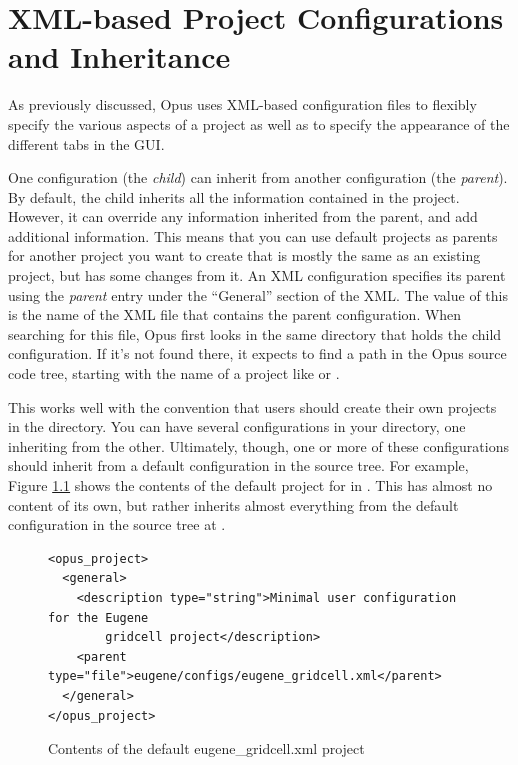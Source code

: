 \chapter{XML-based Project Configurations and Inheritance}
\label{chapter:xml-inheritance}

As previously discussed, Opus uses XML-based configuration files to
flexibly specify the various aspects of a project as well as to specify the
appearance of the different tabs in the GUI\@.

One configuration (the \emph{child}) can inherit from another configuration
(the \emph{parent}).  By default, the child inherits all the information
contained in the project.  However, it can override any information
inherited from the parent, and add additional information.  This means that
you can use default projects as parents for another project you want to
create that is mostly the same as an existing project, but has some changes
from it.  An XML configuration specifies its parent using the \emph{parent}
entry under the ``General'' section of the XML\@.  The value of this is the
name of the XML file that contains the parent configuration.  When
searching for this file, Opus first looks in the same directory that holds
the child configuration.  If it's not found there, it expects to find a
path in the Opus source code tree, starting with the name of a project like
 or .

This works well with the convention that users should create their own
projects in the  directory.  You can have
several configurations in your  directory, one
inheriting from the other.  Ultimately, though, one or more of these
configurations should inherit from a default configuration in the source
tree.  For example, Figure \ref{fig:eugene-gridcell-xml-default} shows the
contents of the default project for  in
.  This has almost no content of its own, but
rather inherits almost everything from the default configuration in the
source tree at .

\begin{figure}[htp]
\begin{center}
\begin{verbatim}
<opus_project>
  <general>
    <description type="string">Minimal user configuration for the Eugene 
        gridcell project</description>
    <parent type="file">eugene/configs/eugene_gridcell.xml</parent>
  </general>
</opus_project>
\end{verbatim}
\end{center}
\caption{Contents of the default eugene\_gridcell.xml project}
\label{fig:eugene-gridcell-xml-default}
\end{figure}

